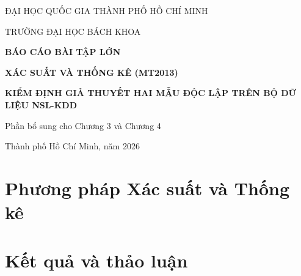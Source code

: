 \documentclass[12pt,a4paper,oneside]{report}
\begin{document}
\begin{titlepage}
  \centering
  {\large ĐẠI HỌC QUỐC GIA THÀNH PHỐ HỒ CHÍ MINH\par}
  {\large TRƯỜNG ĐẠI HỌC BÁCH KHOA\par}
  \vspace{2.4cm}
  {\Large\bfseries BÁO CÁO BÀI TẬP LỚN\par}
  \vspace{0.4cm}
  {\Large\bfseries XÁC SUẤT VÀ THỐNG KÊ (MT2013)\par}
  \vspace{1.5cm}
  {\LARGE\bfseries KIỂM ĐỊNH GIẢ THUYẾT HAI MẪU ĐỘC LẬP TRÊN BỘ DỮ LIỆU NSL-KDD\par}
  \vfill
  {\large Phần bổ sung cho Chương 3 và Chương 4\par}
  \vspace{1cm}
  {\large Thành phố Hồ Chí Minh, năm 2026\par}
\end{titlepage}

\tableofcontents
\clearpage
\listoffigures
\clearpage
\listoftables
\clearpage
{}

\setcounter{chapter}{2}
\chapter{Phương pháp Xác suất và Thống kê}
\setcounter{section}{5}


\setcounter{chapter}{3}
\chapter{Kết quả và thảo luận}
\setcounter{section}{5}

\end{document}
